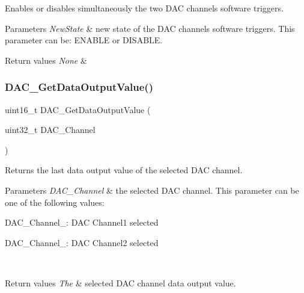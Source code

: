 Enables or disables simultaneously the two D\+AC channels software triggers. 


\begin{DoxyParams}{Parameters}
{\em New\+State} & new state of the D\+AC channels software triggers. This parameter can be\+: E\+N\+A\+B\+LE or D\+I\+S\+A\+B\+LE. \\
\hline
\end{DoxyParams}

\begin{DoxyRetVals}{Return values}
{\em None} & \\
\hline
\end{DoxyRetVals}
\mbox{\label{group___d_a_c___exported___functions_ga51274838de1e5dd012a82d7f44d7a50b}} 
\subsubsection{\texorpdfstring{DAC\_GetDataOutputValue()}{DAC\_GetDataOutputValue()}}
{\footnotesize\ttfamily uint16\+\_\+t D\+A\+C\+\_\+\+Get\+Data\+Output\+Value (\begin{DoxyParamCaption}\item[{uint32\+\_\+t}]{D\+A\+C\+\_\+\+Channel }\end{DoxyParamCaption})}



Returns the last data output value of the selected D\+AC channel. 


\begin{DoxyParams}{Parameters}
{\em D\+A\+C\+\_\+\+Channel} & the selected D\+AC channel. This parameter can be one of the following values\+: \begin{DoxyItemize}
\item D\+A\+C\+\_\+\+Channel\+\_\+: D\+AC Channel1 selected \item D\+A\+C\+\_\+\+Channel\+\_\+: D\+AC Channel2 selected \end{DoxyItemize}
\\
\hline
\end{DoxyParams}

\begin{DoxyRetVals}{Return values}
{\em The} & selected D\+AC channel data output value. \\
\hline
\end{DoxyRetVals}
\mbox{\label{group___d_a_c___exported___functions_ga7c59850468ed4bf0659663fe495441da}} 
